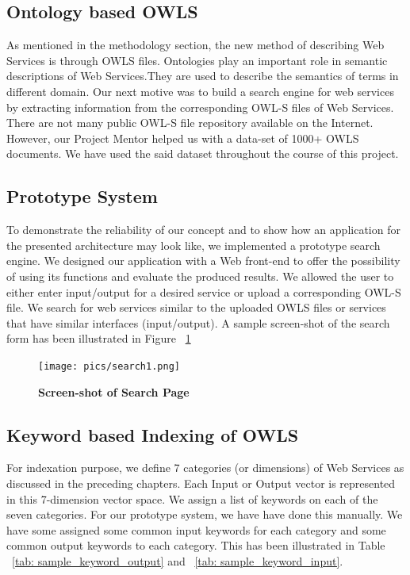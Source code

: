 \documentclass[12pt, oneside]{book}
\begin{document}
\subsection{Ontology based OWLS}
As mentioned in the methodology section, the new method of describing Web Services is through OWLS files. Ontologies play an important role in semantic descriptions of Web Services.They are used to describe the semantics of terms in different domain. Our next motive was to build a search engine for web services by extracting information from the corresponding OWL-S files of Web Services. There are not many public OWL-S file repository available on the Internet. However, our Project Mentor helped us with a data-set of 1000+ OWLS documents. We have used the said dataset throughout the course of this project.\\

\subsection{Prototype System}
To demonstrate the reliability of our concept and to show how an application for the presented architecture may look like, we implemented a prototype search engine. We designed our application with a Web front-end to offer the possibility of using its functions and evaluate the produced results. We allowed the user to either enter input/output for a desired service or upload a corresponding OWL-S file. We search for web services similar to the uploaded OWLS files or services that have similar interfaces (input/output). A sample screen-shot of the search form has been illustrated in Figure ~\ref{fig: search} \\ \par
\begin{figure}[h]
 \centering
 \texttt{[image: pics/search1.png]}
 \caption{\textbf{Screen-shot of Search Page}}
 \label{fig: search}
\end{figure}


\subsection{Keyword based Indexing of OWLS}
For indexation purpose, we define 7 categories (or dimensions) of Web Services as discussed in the preceding chapters. Each Input or Output vector is represented in this 7-dimension vector space. We assign a list of keywords on each of the seven categories. For our prototype system, we have have done this manually. We have some assigned some common input keywords for each category and some common output keywords to each category. This has been illustrated in Table ~\ref{tab: sample_keyword_output} and ~\ref{tab: sample_keyword_input}.
\end{document}
